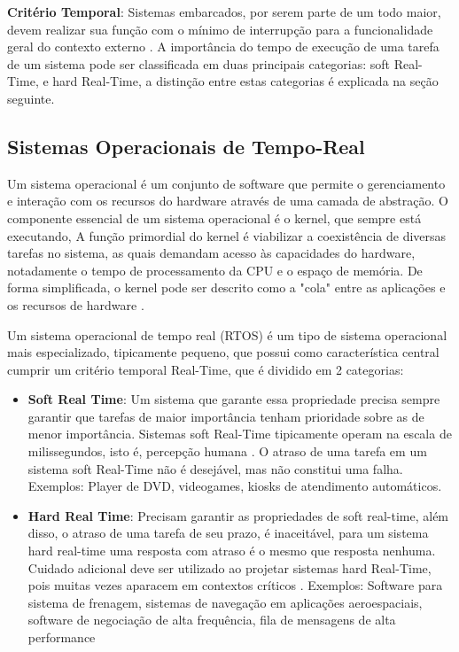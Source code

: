 \textbf{Critério Temporal}: Sistemas embarcados, por serem parte de um todo maior, devem realizar sua função com o mínimo de interrupção para a funcionalidade geral do contexto externo \cite{OperatingSystemConcepts}. A importância do tempo de execução de uma tarefa de um sistema pode ser classificada em duas principais categorias: soft Real-Time, e hard Real-Time, a distinção entre estas categorias é explicada na seção seguinte.

\subsection{Sistemas Operacionais de Tempo-Real}

Um sistema operacional é um conjunto de software que permite o gerenciamento e interação com os recursos do hardware através de uma camada de abstração. O componente essencial de um sistema operacional é o kernel, que sempre está executando, A função primordial do kernel é viabilizar a coexistência de diversas tarefas no sistema, as quais demandam acesso às capacidades do hardware, notadamente o tempo de processamento da CPU e o espaço de memória. De forma simplificada, o kernel pode ser descrito como a "cola" entre as aplicações e os recursos de hardware \cite{OperatingSystemConcepts}.

Um sistema operacional de tempo real (RTOS) é um tipo de sistema operacional mais especializado, tipicamente pequeno, que possui como característica central cumprir um critério temporal Real-Time, que é dividido em 2 categorias:

\begin{itemize}
    \item \textbf{Soft Real Time}: Um sistema que garante essa propriedade precisa sempre garantir que tarefas de  maior importância tenham prioridade sobre as de menor importância. Sistemas soft Real-Time tipicamente operam na escala de milissegundos, isto é, percepção humana \cite{SchedAndOptOfDistributedFT}. O atraso de uma tarefa em um sistema soft Real-Time não é desejável, mas não constitui uma falha. Exemplos: Player de DVD, videogames, kiosks de atendimento automáticos.
    
    \item \textbf{Hard Real Time}: Precisam garantir as propriedades de soft real-time, além disso, o atraso de uma tarefa de seu prazo, é inaceitável, para um sistema hard real-time uma resposta com atraso é o mesmo que resposta nenhuma. Cuidado adicional deve ser utilizado ao projetar sistemas hard Real-Time, pois muitas vezes aparacem em contextos críticos \cite{ModernOperatingSystems}. Exemplos: Software para sistema de frenagem, sistemas de navegação em aplicações aeroespaciais, software de negociação de alta frequência, fila de mensagens de alta performance
\end{itemize}

